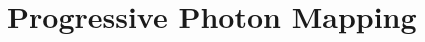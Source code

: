 \documentclass[main.tex]{subfiles}
\begin{document}
\section{Progressive Photon Mapping} \label{section:ppm_initial}

\end{document}
